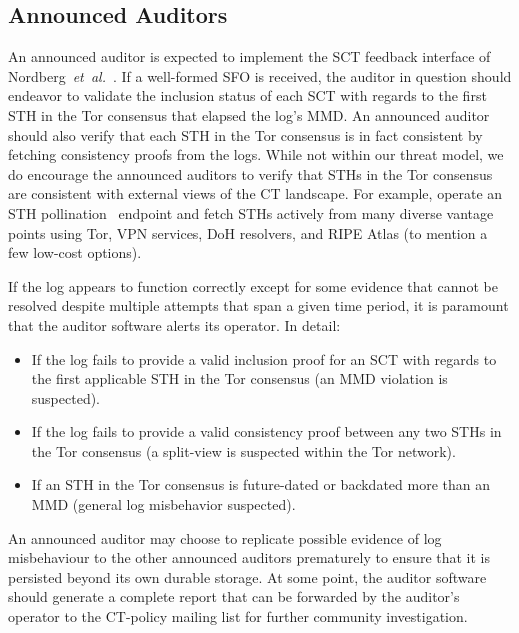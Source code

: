 \subsection{Announced Auditors}
An announced auditor is expected to implement the SCT feedback interface of
Nordberg~\emph{et~al.}~\cite{nordberg}.  If a well-formed SFO is received, the
auditor in question should endeavor to validate the inclusion status of each SCT
with regards to the first STH in the Tor consensus that elapsed the log's MMD.
An announced auditor should also verify that each STH in the Tor consensus is
in fact consistent by fetching consistency proofs from the logs.
While not within our threat model, we do encourage the announced auditors to
verify that STHs in the Tor consensus are consistent with external views of the
CT landscape.  For example, operate an STH pollination~\cite{nordberg} endpoint
and fetch STHs actively from many diverse vantage points using Tor, VPN
services, DoH resolvers, and RIPE Atlas (to mention a few low-cost options).

If the log appears to function correctly except for some evidence that cannot be
resolved despite multiple attempts that span a given time period, it is
paramount that the auditor software alerts its operator.  In detail:
\begin{itemize}
	\item If the log fails to provide a valid inclusion proof for an SCT with
		regards to the first applicable STH in the Tor consensus
		(an MMD violation is suspected).
	\item If the log fails to provide a valid consistency proof between any two
		STHs in the Tor consensus
		(a split-view is suspected within the Tor network).
	\item If an STH in the Tor consensus is future-dated or backdated more than
		an MMD (general log misbehavior suspected).
\end{itemize}

An announced auditor may choose to replicate possible evidence of log
misbehaviour to the other announced auditors prematurely to ensure that
it is persisted beyond its own durable storage.  At some point, the auditor
software should generate a complete report that can be forwarded by the
auditor's operator to the CT-policy mailing list for further community
investigation.
